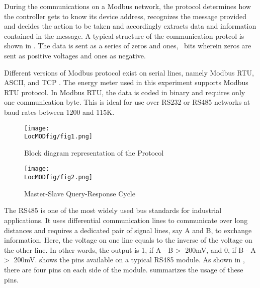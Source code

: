 During the communications on a Modbus network, the protocol determines
how the controller gets to know its device address, recognizes the
message provided and decides the action to be taken and accordingly
extracts data and information contained in the message. A typical structure 
of the communication protcol is shown in .  The data is
sent as a series of zeros and ones, \ie\ bits wherein zeros are sent
as positive voltages and ones as negative. 

Different versions of Modbus protocol exist on serial lines, namely
Modbus RTU, ASCII, and TCP \cite{simplymodbus}. 
The energy meter used in this experiment
supports Modbus RTU protocol. In Modbus RTU, the data is coded in
binary and requires only one communication byte. This is ideal for use
over RS232 or RS485 networks at baud rates between 1200 and 115K.

\begin{figure}
  \centering
  \texttt{[image: \\LocMODfig/fig1.png]}
  \caption{Block diagram representation of the Protocol}
  \label{mod-block}
\end{figure}


\begin{figure}
  \centering
  \texttt{[image: \\LocMODfig/fig2.png]}
  \caption{Master-Slave Query-Response Cycle}
  \label{mod-master-slave}
\end{figure}

The RS485 is one of the most widely used bus standards for industrial
applications. It uses differential communication lines to communicate
over long distances and requires a dedicated pair of signal lines, say
A and B, to exchange information. Here, the voltage on one line equals
to the inverse of the voltage on the other line. In other words, the
output is 1, if A - B \textgreater $\;$ 200mV, and 0, if B - A \textgreater $\;$
200mV.  shows the pins available
on a typical RS485 module. As shown in , there are four pins on each side 
of the module.  summarizes the usage of these pins. 

